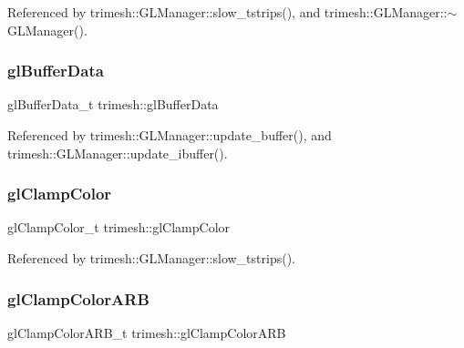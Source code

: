 Referenced by trimesh\+::\+G\+L\+Manager\+::slow\+\_\+tstrips(), and trimesh\+::\+G\+L\+Manager\+::$\sim$\+G\+L\+Manager().

\mbox{\label{namespacetrimesh_a4c87bbfb299e7881a16f5c1f0711ed88}} 
\subsubsection{\texorpdfstring{gl\+Buffer\+Data}{glBufferData}}
{\footnotesize\ttfamily gl\+Buffer\+Data\+\_\+t trimesh\+::gl\+Buffer\+Data\hspace{0.3cm}{\ttfamily [static]}}



Referenced by trimesh\+::\+G\+L\+Manager\+::update\+\_\+buffer(), and trimesh\+::\+G\+L\+Manager\+::update\+\_\+ibuffer().

\mbox{\label{namespacetrimesh_aeec8d56590fc0f6d676bb6361eb4d3aa}} 
\subsubsection{\texorpdfstring{gl\+Clamp\+Color}{glClampColor}}
{\footnotesize\ttfamily gl\+Clamp\+Color\+\_\+t trimesh\+::gl\+Clamp\+Color\hspace{0.3cm}{\ttfamily [static]}}



Referenced by trimesh\+::\+G\+L\+Manager\+::slow\+\_\+tstrips().

\mbox{\label{namespacetrimesh_a0333f6dd0714963a37318634e4a34177}} 
\subsubsection{\texorpdfstring{gl\+Clamp\+Color\+A\+RB}{glClampColorARB}}
{\footnotesize\ttfamily gl\+Clamp\+Color\+A\+R\+B\+\_\+t trimesh\+::gl\+Clamp\+Color\+A\+RB\hspace{0.3cm}{\ttfamily [static]}}



